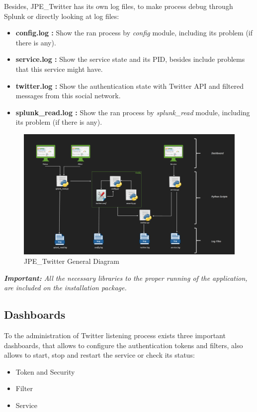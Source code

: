 \documentclass[report]{article}
\begin{document}
Besides, JPE\_Twitter has its own log files, to make process debug through Splunk or directly looking at log files: 
\newline
\begin{itemize}
\item {\bf config.log :} Show the ran process by \textit{config} module, including its problem (if there is
any).

\item {\bf service.log :} Show the service state and its PID, besides include problems that this service might have.

\item {\bf twitter.log :} Show the authentication state with Twitter API and filtered messages from this social network.

\item {\bf splunk\_read.log :} Show the ran process by \textit{splunk\_read} module, including its problem (if there is any).
\newline
\end{itemize}

\begin{figure}[h!]
	\centering
	\includegraphics[scale=0.33]{img/arquitectura.PNG}
	\caption{\color{text}JPE\_Twitter General Diagram}
\end{figure}

\textit{\small \textbf{Important:} All the necessary libraries to  the proper running of the application, are included on the installation package.}
\newpage
\subsection{Dashboards}

To the administration of Twitter listening process exists three important dashboards, that allows to configure the authentication tokens and filters, also allows to start, stop and restart  the service or check its status: 
\newline
\begin{itemize}
\item Token and Security
\item Filter
\item Service
\newline
\end{itemize}
\end{document}
